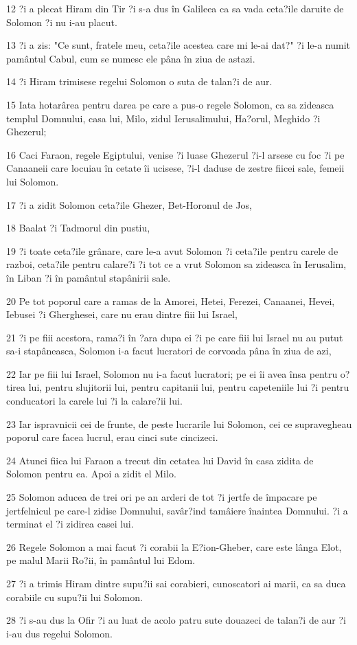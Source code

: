 \par 12 ?i a plecat Hiram din Tir ?i s-a dus în Galileea ca sa vada ceta?ile daruite de Solomon ?i nu i-au placut.
\par 13 ?i a zis: "Ce sunt, fratele meu, ceta?ile acestea care mi le-ai dat?" ?i le-a numit pamântul Cabul, cum se numesc ele pâna în ziua de astazi.
\par 14 ?i Hiram trimisese regelui Solomon o suta de talan?i de aur.
\par 15 Iata hotarârea pentru darea pe care a pus-o regele Solomon, ca sa zideasca templul Domnului, casa lui, Milo, zidul Ierusalimului, Ha?orul, Meghido ?i Ghezerul;
\par 16 Caci Faraon, regele Egiptului, venise ?i luase Ghezerul ?i-l arsese cu foc ?i pe Canaaneii care locuiau în cetate îi ucisese, ?i-l daduse de zestre fiicei sale, femeii lui Solomon.
\par 17 ?i a zidit Solomon ceta?ile Ghezer, Bet-Horonul de Jos,
\par 18 Baalat ?i Tadmorul din pustiu,
\par 19 ?i toate ceta?ile grânare, care le-a avut Solomon ?i ceta?ile pentru carele de razboi, ceta?ile pentru calare?i ?i tot ce a vrut Solomon sa zideasca în Ierusalim, în Liban ?i în pamântul stapânirii sale.
\par 20 Pe tot poporul care a ramas de la Amorei, Hetei, Ferezei, Canaanei, Hevei, Iebusei ?i Gherghesei, care nu erau dintre fiii lui Israel,
\par 21 ?i pe fiii acestora, rama?i în ?ara dupa ei ?i pe care fiii lui Israel nu au putut sa-i stapâneasca, Solomon i-a facut lucratori de corvoada pâna în ziua de azi,
\par 22 Iar pe fiii lui Israel, Solomon nu i-a facut lucratori; pe ei îi avea însa pentru o?tirea lui, pentru slujitorii lui, pentru capitanii lui, pentru capeteniile lui ?i pentru conducatori la carele lui ?i la calare?ii lui.
\par 23 Iar ispravnicii cei de frunte, de peste lucrarile lui Solomon, cei ce supravegheau poporul care facea lucrul, erau cinci sute cincizeci.
\par 24 Atunci fiica lui Faraon a trecut din cetatea lui David în casa zidita de Solomon pentru ea. Apoi a zidit el Milo.
\par 25 Solomon aducea de trei ori pe an arderi de tot ?i jertfe de împacare pe jertfelnicul pe care-l zidise Domnului, savâr?ind tamâiere înaintea Domnului. ?i a terminat el ?i zidirea casei lui.
\par 26 Regele Solomon a mai facut ?i corabii la E?ion-Gheber, care este lânga Elot, pe malul Marii Ro?ii, în pamântul lui Edom.
\par 27 ?i a trimis Hiram dintre supu?ii sai corabieri, cunoscatori ai marii, ca sa duca corabiile cu supu?ii lui Solomon.
\par 28 ?i s-au dus la Ofir ?i au luat de acolo patru sute douazeci de talan?i de aur ?i i-au dus regelui Solomon.

